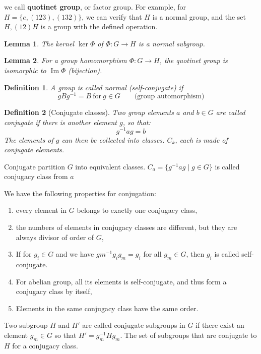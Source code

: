 \documentclass{amsart}
\newtheorem{definition}{Definition}
\newtheorem{lemma}{Lemma}
\DeclareMathOperator{\Image}{Im}
\begin{document}
we call \textbf{quotinet group}, or factor group.
For example, for $H = \{e,(123),(132)\}$, we can verify that $H$ is a normal group, and the 
set ${H, (12)H}$ is a group with the defined operation.

\begin{lemma}
    The kernel $\ker\Phi$ of $\Phi\colon G\to H$ is a normal subgroup.
\end{lemma}

\begin{lemma}
    For a group homomorphism $\Phi\colon G\to H$, the quotinet group is isomorphic to $\Image\Phi$ (bijection).
\end{lemma}


\begin{definition}
    A group is called normal (self-conjugate) if 
    \[
        gBg^{-1} = B\ \text{for}\ g \in G \qquad \text{(group automorphism)}    
    \]
\end{definition}

\begin{definition}
    [Conjugate classes]
    Two group elements $a$ and $b\in G$ are called conjugate if there is another element $g$, so that:
    \[g^{-1}ag = b\]
    The elements of $g$ can then be collected into classes. $C_k$, each is made of conjugate elements. 
\end{definition}
Conjugate partition $G$ into equivalent classes. $C_a = \{g^{-1}ag\mid g\in G\}$ is called conjugacy class 
from $a$

We have the following properties for conjugation:
\begin{enumerate}
    \item every element in $G$ belongs to exactly one conjugacy class,
    \item the numbers of elements in conjugacy classes are different, but they are always divisor of order of $G$,
    \item If for $g_i\in G$ and we have $gm^{-1}g_i g_m = g_i$ for all $g_m \in G$, then $g_i$ is called self-conjugate. 
    \item For abelian group, all its elements is self-conjugate, and thus form a conjugacy class by itself,
    \item Elements in the same conjugacy class have the same order.
\end{enumerate}

Two subgroup $H$ and $H'$ are called conjugate subgroups in $G$ if there exist an element $g_m\in G$
so that $H' = g_m^{-1}Hg_m$. The set of subgroups that are conjugate to $H$ for a conjugacy class. 
\end{document}
